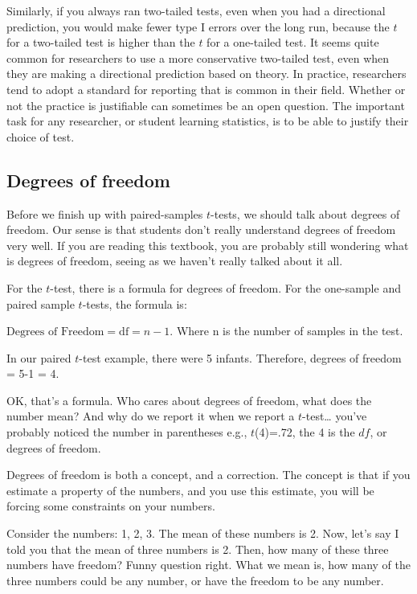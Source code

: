 \documentclass[
]{book}
\begin{document}
Similarly, if you always ran two-tailed tests, even when you had a directional prediction, you would make fewer type I errors over the long run, because the \(t\) for a two-tailed test is higher than the \(t\) for a one-tailed test. It seems quite common for researchers to use a more conservative two-tailed test, even when they are making a directional prediction based on theory. In practice, researchers tend to adopt a standard for reporting that is common in their field. Whether or not the practice is justifiable can sometimes be an open question. The important task for any researcher, or student learning statistics, is to be able to justify their choice of test.

\subsection{Degrees of freedom}\label{degrees-of-freedom}

Before we finish up with paired-samples \(t\)-tests, we should talk about degrees of freedom. Our sense is that students don't really understand degrees of freedom very well. If you are reading this textbook, you are probably still wondering what is degrees of freedom, seeing as we haven't really talked about it all.

For the \(t\)-test, there is a formula for degrees of freedom. For the one-sample and paired sample \(t\)-tests, the formula is:

\(\text{Degrees of Freedom} = \text{df} = n-1\). Where n is the number of samples in the test.

In our paired \(t\)-test example, there were 5 infants. Therefore, degrees of freedom = 5-1 = 4.

OK, that's a formula. Who cares about degrees of freedom, what does the number mean? And why do we report it when we report a \(t\)-test\ldots{} you've probably noticed the number in parentheses e.g., \(t\)(4)=.72, the 4 is the \(df\), or degrees of freedom.

Degrees of freedom is both a concept, and a correction. The concept is that if you estimate a property of the numbers, and you use this estimate, you will be forcing some constraints on your numbers.

Consider the numbers: 1, 2, 3. The mean of these numbers is 2. Now, let's say I told you that the mean of three numbers is 2. Then, how many of these three numbers have freedom? Funny question right. What we mean is, how many of the three numbers could be any number, or have the freedom to be any number.
\end{document}
